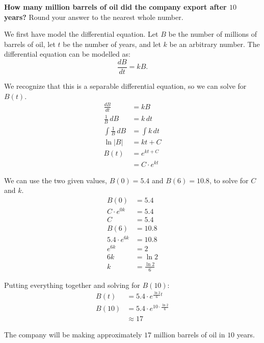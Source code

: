 \documentclass[12pt]{article}
\begin{document}
\begin{enumerate}
          \noindent \textbf{How many million barrels of oil did the company export after $10$ years?} Round your answer to the nearest whole number.

          \vspace{6mm}

          We first have model the differential equation. Let $B$ be the number of millions of barrels of oil, let $t$ be the number of years, and let $k$ be an arbitrary number. The differential equation can be modelled as:
          \[ \frac{dB}{dt} = kB. \]

          We recognize that this is a separable differential equation, so we can solve for $B(t)$.
          \begin{align*}
              \frac{dB}{dt}          & = kB             \\[6pt]
              \frac{1}{B} \, dB      & = k \, dt        \\[6pt]
              \int \frac{1}{B} \, dB & = \int k \, dt   \\[6pt]
              \ln|B|                 & = kt + C         \\
              B(t)                   & = e^{kt + C}     \\
                                     & = C \cdot e^{kt}
          \end{align*}

          We can use the two given values, $B(0) = 5.4$ and $B(6) = 10.8$, to solve for $C$ and $k$.
          \begin{align*}
              B(0)             & = 5.4             \\
              C \cdot e^{0k}   & = 5.4             \\
              C                & = 5.4             \\[10pt]
              B(6)             & = 10.8            \\
              5.4 \cdot e^{6k} & = 10.8            \\
              e^{6k}           & = 2               \\
              6k               & = \ln 2           \\
              k                & = \frac{\ln 2}{6}
          \end{align*}

          Putting everything together and solving for $B(10)$:
          \begin{align*}
              B(t)  & = 5.4 \cdot e^{\frac{\ln 2}{6} t}        \\
              B(10) & = 5.4 \cdot e^{10 \cdot \frac{\ln 2}{6}} \\
                    & \approx 17
          \end{align*}

          The company will be making approximately $17$ million barrels of oil in $10$ years.
\end{enumerate}
\end{document}
